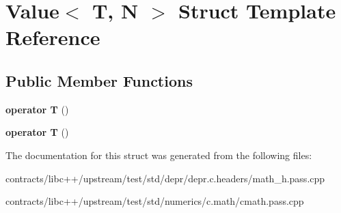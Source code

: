 \hypertarget{struct_value}{}\section{Value$<$ T, N $>$ Struct Template Reference}
\label{struct_value}
\subsection*{Public Member Functions}
\begin{DoxyCompactItemize}
\item 
\mbox{\label{struct_value_a97bb45ee122bc3500df60fa06c358167}} 
{\bfseries operator T} ()
\item 
\mbox{\label{struct_value_a97bb45ee122bc3500df60fa06c358167}} 
{\bfseries operator T} ()
\end{DoxyCompactItemize}


The documentation for this struct was generated from the following files\+:\begin{DoxyCompactItemize}
\item 
contracts/libc++/upstream/test/std/depr/depr.\+c.\+headers/math\+\_\+h.\+pass.\+cpp\item 
contracts/libc++/upstream/test/std/numerics/c.\+math/cmath.\+pass.\+cpp\end{DoxyCompactItemize}
